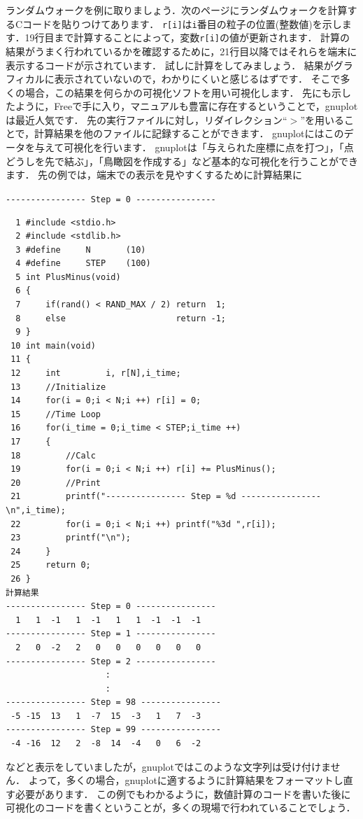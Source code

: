 \documentclass[platex,a4paper,12pt]{jsarticle}%
\begin{document}
ランダムウォークを例に取りましょう．次のページにランダムウォークを計算するCコードを貼りつけてあります．
\verb|r[i]|は\verb|i|番目の粒子の位置(整数値)を示します．19行目まで計算することによって，変数\verb|r[i]|の値が更新されます．
計算の結果がうまく行われているかを確認するために，21行目以降ではそれらを端末に表示するコードが示されています．
試しに計算をしてみましょう．
結果がグラフィカルに表示されていないので，わかりにくいと感じるはずです．
そこで多くの場合，この結果を何らかの可視化ソフトを用い可視化します．
先にも示したように，Freeで手に入り，マニュアルも豊富に存在するということで，gnuplotは最近人気です．
先の実行ファイルに対し，リダイレクション``$>$''を用いることで，計算結果を他のファイルに記録することができます．
gnuplotにはこのデータを与えて可視化を行います．
gnuplotは「与えられた座標に点を打つ」，「点どうしを先で結ぶ」，「鳥瞰図を作成する」など基本的な可視化を行うことができます．
先の例では，端末での表示を見やすくするために計算結果に

\verb|---------------- Step = 0 ----------------|

\newpage

\begin{verbatim}
  1 #include <stdio.h>
  2 #include <stdlib.h>
  3 #define     N       (10)
  4 #define     STEP    (100)
  5 int PlusMinus(void)
  6 {
  7     if(rand() < RAND_MAX / 2) return  1;
  8     else                      return -1;
  9 }
 10 int main(void)
 11 {
 12     int         i, r[N],i_time;
 13     //Initialize
 14     for(i = 0;i < N;i ++) r[i] = 0;
 15     //Time Loop
 16     for(i_time = 0;i_time < STEP;i_time ++)
 17     {
 18         //Calc
 19         for(i = 0;i < N;i ++) r[i] += PlusMinus();
 20         //Print
 21         printf("---------------- Step = %d ----------------\n",i_time);
 22         for(i = 0;i < N;i ++) printf("%3d ",r[i]);
 23         printf("\n");
 24     }
 25     return 0;
 26 }
計算結果
---------------- Step = 0 ----------------
  1   1  -1   1  -1   1   1  -1  -1  -1 
---------------- Step = 1 ----------------
  2   0  -2   2   0   0   0   0   0   0 
---------------- Step = 2 ----------------
　　　　　　　　　　　　:
　　　　　　　　　　　　:
---------------- Step = 98 ----------------
 -5 -15  13   1  -7  15  -3   1   7  -3 
---------------- Step = 99 ----------------
 -4 -16  12   2  -8  14  -4   0   6  -2 
\end{verbatim}

\noindent
などと表示をしていましたが，gnuplotではこのような文字列は受け付けません．
よって，多くの場合，gnuplotに適するように計算結果をフォーマットし直す必要があります．
この例でもわかるように，数値計算のコードを書いた後に可視化のコードを書くということが，多くの現場で行われていることでしょう．
\end{document}
